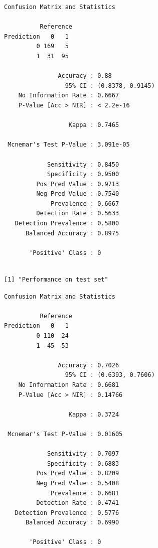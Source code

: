 \documentclass[
  letterpaper,
  DIV=11,
  numbers=noendperiod]{scrartcl}
\begin{document}
\begin{verbatim}
Confusion Matrix and Statistics

          Reference
Prediction   0   1
         0 169   5
         1  31  95
                                          
               Accuracy : 0.88            
                 95% CI : (0.8378, 0.9145)
    No Information Rate : 0.6667          
    P-Value [Acc > NIR] : < 2.2e-16       
                                          
                  Kappa : 0.7465          
                                          
 Mcnemar's Test P-Value : 3.091e-05       
                                          
            Sensitivity : 0.8450          
            Specificity : 0.9500          
         Pos Pred Value : 0.9713          
         Neg Pred Value : 0.7540          
             Prevalence : 0.6667          
         Detection Rate : 0.5633          
   Detection Prevalence : 0.5800          
      Balanced Accuracy : 0.8975          
                                          
       'Positive' Class : 0               
                                          
\end{verbatim}

\begin{verbatim}
[1] "Performance on test set"
\end{verbatim}

\begin{verbatim}
Confusion Matrix and Statistics

          Reference
Prediction   0   1
         0 110  24
         1  45  53
                                          
               Accuracy : 0.7026          
                 95% CI : (0.6393, 0.7606)
    No Information Rate : 0.6681          
    P-Value [Acc > NIR] : 0.14766         
                                          
                  Kappa : 0.3724          
                                          
 Mcnemar's Test P-Value : 0.01605         
                                          
            Sensitivity : 0.7097          
            Specificity : 0.6883          
         Pos Pred Value : 0.8209          
         Neg Pred Value : 0.5408          
             Prevalence : 0.6681          
         Detection Rate : 0.4741          
   Detection Prevalence : 0.5776          
      Balanced Accuracy : 0.6990          
                                          
       'Positive' Class : 0               
                                          
\end{verbatim}
\end{document}
